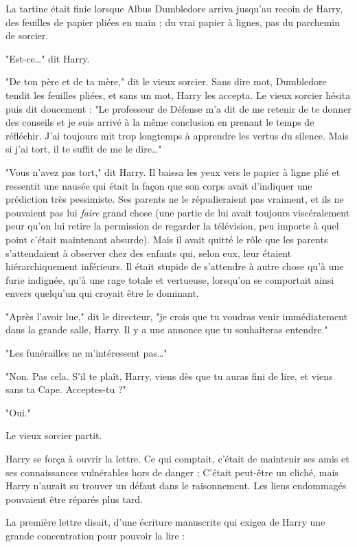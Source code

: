 La tartine était finie lorsque Albus Dumbledore arriva jusqu'au recoin de Harry, des feuilles de papier pliées en main ; du vrai papier à lignes, pas du parchemin de sorcier.

"Est-ce…" dit Harry.

"De ton père et de ta mère," dit le vieux sorcier. Sans dire mot, Dumbledore tendit les feuilles pliées, et sans un mot, Harry les accepta. Le vieux sorcier hésita puis dit doucement : "Le professeur de Défense m'a dit de me retenir de te donner des conseils et je suis arrivé à la même conclusion en prenant le temps de réfléchir. J'ai toujours mit trop longtemps à apprendre les vertus du silence. Mais si j'ai tort, il te suffit de me le dire…"

"Vous n'avez pas tort," dit Harry. Il baissa les yeux vers le papier à ligne plié et ressentit une nausée qui était la façon que son corps avait d'indiquer une prédiction très pessimiste. Ses parents ne le répudieraient pas vraiment, et ils ne pouvaient pas lui \emph{faire}  grand chose (une partie de lui avait toujours viscéralement peur qu'on lui retire la permission de regarder la télévision, peu importe à quel point c'était maintenant absurde). Mais il avait quitté le rôle que les parents s'attendaient à observer chez des enfants qui, selon eux, leur étaient hiérarchiquement inférieurs. Il était stupide de s'attendre à autre chose qu'à une furie indignée, qu'à une rage totale et vertueuse, lorsqu'on se comportait ainsi envers quelqu'un qui croyait être le dominant.

"Après l'avoir lue," dit le directeur, "je crois que tu voudras venir immédiatement dans la grande salle, Harry. Il y a une annonce que tu souhaiteras entendre."

"Les funérailles ne m'intéressent pas…"

"Non. Pas cela. S'il te plaît, Harry, viens dès que tu auras fini de lire, et viens sans ta Cape. Acceptes-tu ?"

"Oui."

Le vieux sorcier partit.

Harry se força à ouvrir la lettre. Ce qui comptait, c'était de maintenir ses amis et ses connaissances vulnérables hors de danger ; C'était peut-être un cliché, mais Harry n'aurait su trouver un défaut dans le raisonnement. Les liens endommagés pouvaient être réparés plus tard.

La première lettre disait, d'une écriture manuscrite qui exigea de Harry une grande concentration pour pouvoir la lire :

